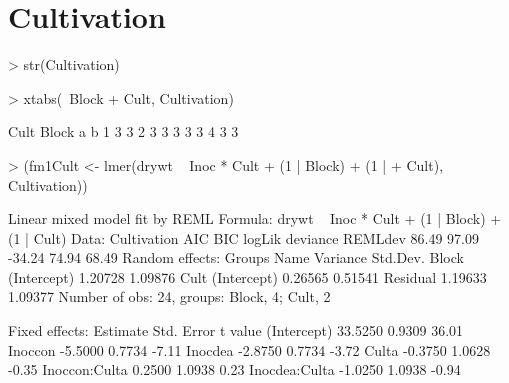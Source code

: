 \documentclass[12pt]{article}
\begin{document}
\section{Cultivation}
\label{sec:Cultivation}

\begin{Schunk}
\begin{Sinput}
> str(Cultivation)
\end{Sinput}
\begin{Sinput}
> xtabs(~Block + Cult, Cultivation)
\end{Sinput}
\begin{Soutput}
     Cult
Block a b
    1 3 3
    2 3 3
    3 3 3
    4 3 3
\end{Soutput}
\begin{Sinput}
> (fm1Cult <- lmer(drywt ~ Inoc * Cult + (1 | Block) + (1 | 
+     Cult), Cultivation))
\end{Sinput}
\begin{Soutput}
Linear mixed model fit by REML 
Formula: drywt ~ Inoc * Cult + (1 | Block) + (1 | Cult) 
   Data: Cultivation 
   AIC   BIC logLik deviance REMLdev
 86.49 97.09 -34.24    74.94   68.49
Random effects:
 Groups   Name        Variance Std.Dev.
 Block    (Intercept) 1.20728  1.09876 
 Cult     (Intercept) 0.26565  0.51541 
 Residual             1.19633  1.09377 
Number of obs: 24, groups: Block, 4; Cult, 2

Fixed effects:
              Estimate Std. Error t value
(Intercept)    33.5250     0.9309   36.01
Inoccon        -5.5000     0.7734   -7.11
Inocdea        -2.8750     0.7734   -3.72
Culta          -0.3750     1.0628   -0.35
Inoccon:Culta   0.2500     1.0938    0.23
Inocdea:Culta  -1.0250     1.0938   -0.94


\end{Soutput}
\end{Schunk}
\end{document}
